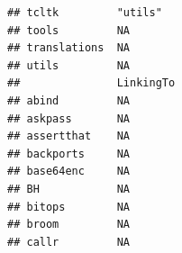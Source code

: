 \documentclass[]{article}
\begin{document}
\begin{verbatim}
## tcltk         "utils"                                                                                                                                                                                                                                                                                                                                                                                                                                                                               
## tools         NA                                                                                                                                                                                                                                                                                                                                                                                                                                                                                    
## translations  NA                                                                                                                                                                                                                                                                                                                                                                                                                                                                                    
## utils         NA                                                                                                                                                                                                                                                                                                                                                                                                                                                                                    
##               LinkingTo                                            
## abind         NA                                                   
## askpass       NA                                                   
## assertthat    NA                                                   
## backports     NA                                                   
## base64enc     NA                                                   
## BH            NA                                                   
## bitops        NA                                                   
## broom         NA                                                   
## callr         NA                                                   

\end{verbatim}
\end{document}
